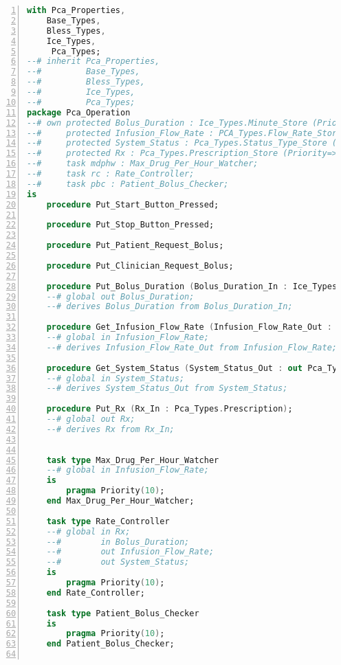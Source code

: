 \newpage

\singlespacing
\begin{lstlisting}[language=ada, gobble=0, numbers=left, caption={\lstinline{Pca_Operation} package}, label={listing:pca_generated:pca_operation}]
with Pca_Properties,
    Base_Types,
    Bless_Types,
    Ice_Types,
     Pca_Types;
--# inherit Pca_Properties,
--#         Base_Types,
--#         Bless_Types,
--#         Ice_Types,
--#         Pca_Types;
package Pca_Operation
--# own protected Bolus_Duration : Ice_Types.Minute_Store (Priority=>10);
--#     protected Infusion_Flow_Rate : PCA_Types.Flow_Rate_Store (Priority=>10);
--#     protected System_Status : Pca_Types.Status_Type_Store (Priority=>10);
--#     protected Rx : Pca_Types.Prescription_Store (Priority=>10);
--#     task mdphw : Max_Drug_Per_Hour_Watcher;
--#     task rc : Rate_Controller;
--#     task pbc : Patient_Bolus_Checker;
is
    procedure Put_Start_Button_Pressed;

    procedure Put_Stop_Button_Pressed;

    procedure Put_Patient_Request_Bolus;

    procedure Put_Clinician_Request_Bolus;

    procedure Put_Bolus_Duration (Bolus_Duration_In : Ice_Types.Minute);
    --# global out Bolus_Duration;
    --# derives Bolus_Duration from Bolus_Duration_In;

    procedure Get_Infusion_Flow_Rate (Infusion_Flow_Rate_Out : out Pca_Types.Flow_Rate);
    --# global in Infusion_Flow_Rate;
    --# derives Infusion_Flow_Rate_Out from Infusion_Flow_Rate;

    procedure Get_System_Status (System_Status_Out : out Pca_Types.Status_Type);
    --# global in System_Status;
    --# derives System_Status_Out from System_Status;

    procedure Put_Rx (Rx_In : Pca_Types.Prescription);
    --# global out Rx;
    --# derives Rx from Rx_In;


    task type Max_Drug_Per_Hour_Watcher
    --# global in Infusion_Flow_Rate;
    is
        pragma Priority(10);
    end Max_Drug_Per_Hour_Watcher;

    task type Rate_Controller
    --# global in Rx;
    --#        in Bolus_Duration;
    --#        out Infusion_Flow_Rate;
    --#        out System_Status;
    is
        pragma Priority(10);
    end Rate_Controller;

    task type Patient_Bolus_Checker
    is
        pragma Priority(10);
    end Patient_Bolus_Checker;


\end{lstlisting}
